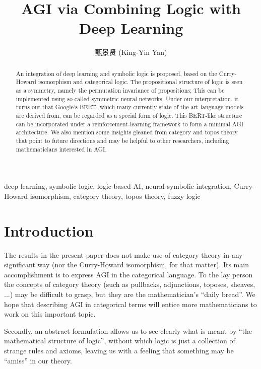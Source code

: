 \documentclass[orivec]{llncs}
\title{AGI via Combining Logic with Deep Learning}
\author{
甄景贤 (King-Yin Yan) 
}
\institute{General.Intelligence@Gmail.com}
\begin{document}
\maketitle

\setlength{\parindent}{0em}
\setlength{\parskip}{2.8ex plus0.8ex minus0.8ex}

\begin{abstract}
An integration of deep learning and symbolic logic is proposed, based on the Curry-Howard isomorphism and categorical logic.  The propositional structure of logic is seen as a symmetry, namely the permutation invariance of propositions;  This can be implemented using so-called symmetric neural networks.  Under our interpretation, it turns out that Google's BERT, which many currently state-of-the-art language models are derived from, can be regarded as a special form of logic.  This BERT-like structure can be incorporated under a reinforcement-learning framework to form a minimal AGI architecture.  We also mention some insights gleaned from category and topos theory that point to future directions and may be helpful to other researchers, including mathematicians interested in AGI.
\end{abstract}

\begin{keywords}
deep learning, symbolic logic, logic-based AI, neural-symbolic integration, Curry-Howard isomorphism, category theory, topos theory, fuzzy logic
\end{keywords}

\setcounter{section}{-1}
\section{Introduction}
\label{sec:0}

The results in the present paper does not make use of category theory in any significant way (nor the Curry-Howard isomorphism, for that matter).  Its main accomplishment is to express AGI in the categorical language.  To the lay person the concepts of category theory (such as pullbacks, adjunctions, toposes, sheaves, ...) may be difficult to grasp, but they are the mathematician's ``daily bread''.  We hope that describing AGI in categorical terms will entice more mathematicians to work on this important topic.

Secondly, an abstract formulation allows us to see clearly what is meant by ``the mathematical structure of logic'', without which logic is just a collection of strange rules and axioms, leaving us with a feeling that something may be ``amiss'' in our theory.
\end{document}
